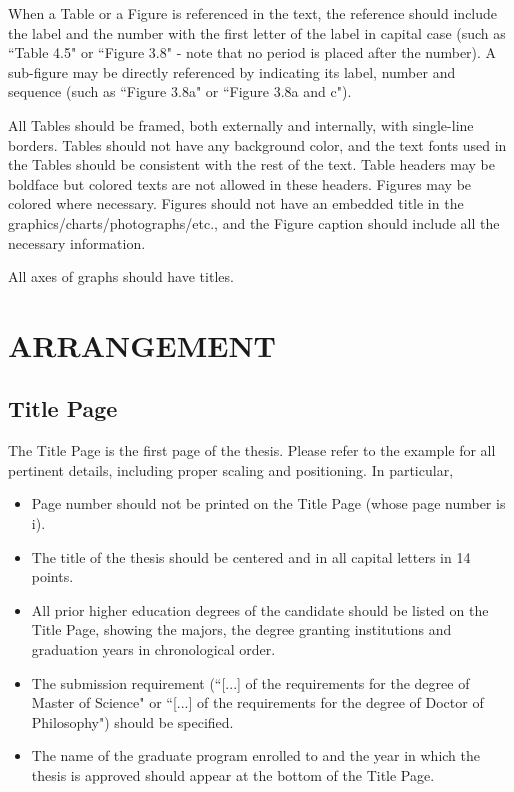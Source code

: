 \documentclass[a4paper,oneside,12pt]{report}
\numberwithin{equation}{chapter}
\begin{document}
When a Table or a Figure is referenced in the text, the reference should include the label and the number with the first letter of the label in capital case (such as
``Table 4.5" or ``Figure 3.8" - note that no period is placed after the number). A sub-figure may be directly referenced by indicating its label, number and sequence (such as ``Figure 3.8a" or ``Figure 3.8a and c").

All Tables should be framed, both externally and internally, with single-line borders. Tables should not have any background color, and the text fonts used in the Tables should
be consistent with the rest of the text. Table headers may be boldface
but colored texts are not allowed in these headers. Figures may be
colored where necessary. Figures should not have an embedded title in
the graphics/charts/photographs/etc., and the Figure caption should include all the necessary information.

All axes of graphs should have titles.



\chapter{ARRANGEMENT}



\section{Title Page}
The Title Page is the first page of the thesis. Please refer to the example for all pertinent details, including proper scaling and positioning. In particular,
\begin{itemize}
\item Page number should not be printed on the Title Page (whose page number is i).
\item The title of the thesis should be centered and in all capital letters in 14 points.
\item All prior higher education degrees of the candidate should be listed on the Title Page, showing the majors, the degree granting institutions and
graduation years in chronological order.
\item The submission requirement (``[...] of the requirements for the degree of Master of Science" or ``[...] of the requirements for the degree of Doctor of Philosophy") should be specified.
\item The name of the graduate program enrolled to and the year in which the thesis is approved should appear at the bottom of the Title Page.
\end{itemize}
\end{document}
